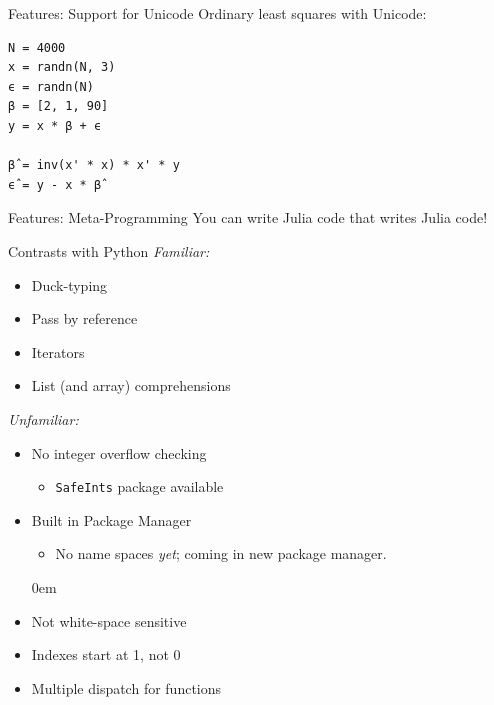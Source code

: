 \documentclass[11pt]{beamer}
\begin{document}
\begin{frame}[fragile]{Features: Support for Unicode}
Ordinary least squares with Unicode:
\begin{verbatim}
N = 4000
x = randn(N, 3)
ϵ = randn(N)
β = [2, 1, 90]
y = x * β + ϵ

β̂ = inv(x' * x) * x' * y
ϵ̂ = y - x * β̂
\end{verbatim}
\end{frame}

\begin{frame}[c]{Features: Meta-Programming}
You can write Julia code that writes Julia code!
\end{frame}



\begin{frame}{Contrasts with Python}
\emph{Familiar:}
\begin{itemize}
    \itemsep0em
    \item Duck-typing
    \item Pass by reference
    \item Iterators
    \item List (and array) comprehensions
\end{itemize}
\emph{Unfamiliar:}
\begin{itemize}
    \itemsep0em
    \item No integer overflow checking
    \begin{itemize}
        \itemsep0em
        \item \texttt{SafeInts} package available
    \end{itemize}
    \item Built in Package Manager
    \begin{itemize}
        \itemsep0em
        \item No name spaces \emph{yet}; coming in new package manager.
    \end{itemize}
    \itemsep0em
    \item Not white-space sensitive
    \item Indexes start at 1, not 0
    \item Multiple dispatch for functions
\end{itemize}
\end{frame}
\end{document}
